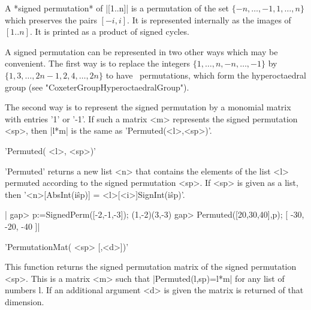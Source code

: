 

A   *signed  permutation*  of   |[1..n]|  is  a   permutation  of  the  set
$\{-n,\ldots,-1,1,\ldots,n\}$  which  preserves  the  pairs $[-i,i]$. It is
represented  internally  as  the  images  of  $[1..n]$.  It is printed as a
product of signed cycles.

A  signed permutation  can be  represented in  two other  ways which may be
convenient. The first way is to replace the integers
$\{1,\ldots,n,-n,\ldots,-1\}$   by  $\{1,3,\ldots,2n-1,2,4,\ldots,2n\}$  to
have   \GAP\  permutations,  which  form   the  hyperoctaedral  group  (see
"CoxeterGroupHyperoctaedralGroup").

The  second way is to represent the signed permutation by a monomial matrix
with  entries  '1'  or  '-1'.  If  such  a matrix <m> represents the signed
permutation <sp>, then |l*m| is the same as 'Permuted(<l>,<sp>)'.

%
%

'Permuted( <l>, <sp>)'

'Permuted'  returns a new list  <n> that contains the  elements of the list
<l>  permuted according to the signed permutation <sp>. If <sp> is given as
a list, then '<n>[AbsInt(i\^sp)] = <l>[<i>]SignInt(i\^sp)'.

|    gap> p:=SignedPerm([-2,-1,-3]);
    (1,-2)(3,-3)
    gap> Permuted([20,30,40],p);
    [ -30, -20, -40 ]|

%
%

'PermutationMat( <sp> [,<d>])'

This   function  returns  the  signed  permutation  matrix  of  the  signed
permutation  <sp>. This is a matrix  <m> such that |Permuted(l,sp)=l*m| for
any list of numbers l. If an additional argument <d> is given the matrix is
returned of that dimension.

